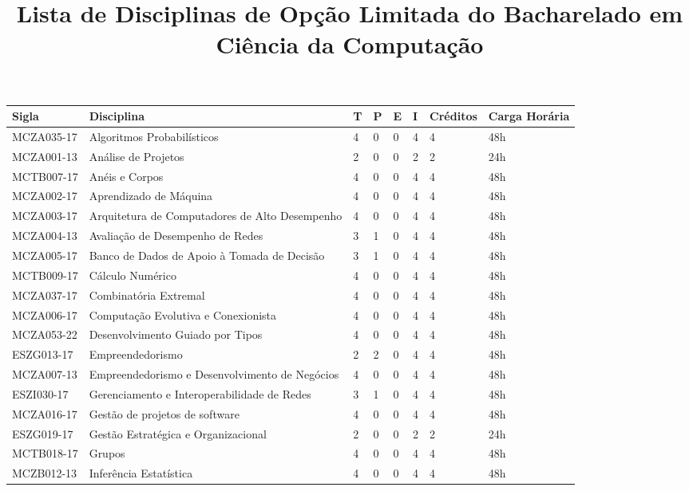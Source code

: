 \documentclass[a4paper]{article}
\title{Lista de Disciplinas de Opção Limitada do Bacharelado em Ciência da Computação}
\author{}
\date{}
\begin{document}
\maketitle

\begin{longtable}{|l|l|llll|l|l|}\hline\endhead\hline\endfoot
\textbf{Sigla} & \textbf{Disciplina} & \textbf{T} & \textbf{P} & \textbf{E} & \textbf{I} & \textbf{Créditos} & \textbf{Carga Horária} \\ \hline\hline
%
MCZA035-17 & Algoritmos Probabilísticos & 4 & 0 & 0 & 4 & 4 & 48h \\
MCZA001-13 & Análise de Projetos & 2 & 0 & 0 & 2 & 2 & 24h \\
MCTB007-17 & Anéis e Corpos & 4 & 0 & 0 & 4 & 4 & 48h \\
MCZA002-17 & Aprendizado de Máquina & 4 & 0 & 0 & 4 & 4 & 48h \\
MCZA003-17 & Arquitetura de Computadores de Alto Desempenho & 4 & 0 & 0 & 4 & 4 & 48h \\
MCZA004-13 & Avaliação de Desempenho de Redes & 3 & 1 & 0 & 4 & 4 & 48h \\
MCZA005-17 & Banco de Dados de Apoio à Tomada de Decisão & 3 & 1 & 0 & 4 & 4 & 48h \\
MCTB009-17 & Cálculo Numérico & 4 & 0 & 0 & 4 & 4 & 48h \\
MCZA037-17 & Combinatória Extremal & 4 & 0 & 0 & 4 & 4 & 48h \\
MCZA006-17 & Computação Evolutiva e Conexionista & 4 & 0 & 0 & 4 & 4 & 48h \\
MCZA053-22 & Desenvolvimento Guiado por Tipos & 4 & 0 & 0 & 4 & 4 & 48h \\
ESZG013-17 & Empreendedorismo & 2 & 2 & 0 & 4 & 4 & 48h \\
MCZA007-13 & Empreendedorismo e Desenvolvimento de Negócios & 4 & 0 & 0 & 4 & 4 & 48h \\
ESZI030-17 & Gerenciamento e Interoperabilidade de Redes & 3 & 1 & 0 & 4 & 4 & 48h \\
MCZA016-17 & Gestão de projetos de software & 4 & 0 & 0 & 4 & 4 & 48h \\
ESZG019-17 & Gestão Estratégica e Organizacional & 2 & 0 & 0 & 2 & 2 & 24h \\
MCTB018-17 & Grupos & 4 & 0 & 0 & 4 & 4 & 48h \\
MCZB012-13 & Inferência Estatística & 4 & 0 & 0 & 4 & 4 & 48h \\

\end{longtable}
\end{document}
